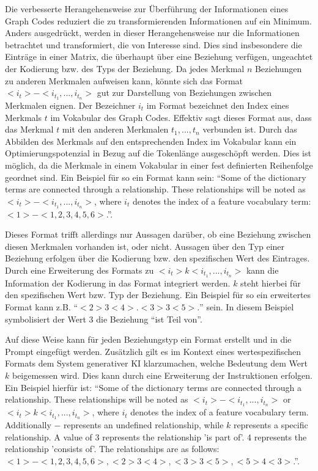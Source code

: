 Die verbesserte Herangehensweise zur Überführung der Informationen eines Graph Codes reduziert die zu transformierenden Informationen auf ein Minimum.
Anders ausgedrückt, werden in dieser Herangehensweise nur die Informationen betrachtet und transformiert, die von Interesse sind.
Dies sind insbesondere die Einträge in einer Matrix, die überhaupt über eine Beziehung verfügen, ungeachtet der Kodierung bzw. des Typs der Beziehung.
Da jedes Merkmal $n$ Beziehungen zu anderen Merkmalen aufweisen kann, könnte sich das Format $<i_{t}> - <i_{t_{1}},...,i_{t_{n}}>$ gut zur Darstellung von Beziehungen zwischen Merkmalen eignen.
Der Bezeichner $i_{t}$ im Format bezeichnet den Index eines Merkmals $t$ im Vokabular des Graph Codes.
Effektiv sagt dieses Format aus, dass das Merkmal $t$ mit den anderen Merkmalen $t_1,...,t_n$ verbunden ist.
Durch das Abbilden des Merkmals auf den entsprechenden Index im Vokabular kann ein Optimierungspotenzial in Bezug auf die Tokenlänge ausgeschöpft werden.
Dies ist möglich, da die Merkmale in einem Vokabular in einer fest definierten Reihenfolge geordnet sind.
Ein Beispiel für so ein Format kann sein: \enquote{Some of the dictionary terms are connected through a relationship. These relationships will be noted as $<i_{t}> - <i_{t_{1}},...,i_{t_{n}}>$, where $i_{t}$ denotes the index of a feature vocabulary term: $<1> - <1,2,3,4,5,6>$.}.

Dieses Format trifft allerdings nur Aussagen darüber, ob eine Beziehung zwischen diesen Merkmalen vorhanden ist, oder nicht.
Aussagen über den Typ einer Beziehung erfolgen über die Kodierung bzw. den spezifischen Wert des Eintrages.
Durch eine Erweiterung des Formats zu $<i_{t}> k <i_{t_1},...,i_{t_n}>$ kann die Information der Kodierung in das Format integriert werden.
$k$ steht hierbei für den spezifischen Wert bzw. Typ der Beziehung.
Ein Beispiel für so ein erweitertes Format kann z.B. \enquote{$<2> 3 <4>. <3> 3 <5>.$} sein.
In diesem Beispiel symbolisiert der Wert 3 die Beziehung \enquote{ist Teil von}.

Auf diese Weise kann für jeden Beziehungstyp ein Format erstellt und in die Prompt eingefügt werden.
Zusätzlich gilt es im Kontext eines wertespezifischen Formats dem System generativer KI klarzumachen, welche Bedeutung dem Wert $k$ beigemessen wird.
Dies kann durch eine Erweiterung der Instruktionen erfolgen.
Ein Beispiel hierfür ist: \enquote{Some of the dictionary terms are connected through a relationship. These relationships will be noted as $<i_{t}> - <i_{t_{1}},...,i_{t_{n}}>$ or $<i_{t}> k <i_{t_{1}},...,i_{t_{n}}>$, where $i_{t}$ denotes the index of a feature vocabulary term. Additionally $-$ represents an undefined relationship, while $k$ represents a specific relationship. A value of 3 represents the relationship 'is part of'. 4 represents the relationship 'consists of'. The relationships are as follows: $<1> - <1,2,3,4,5,6>, <2> 3 <4>, <3> 3 <5>, <5> 4 <3>$.}.

